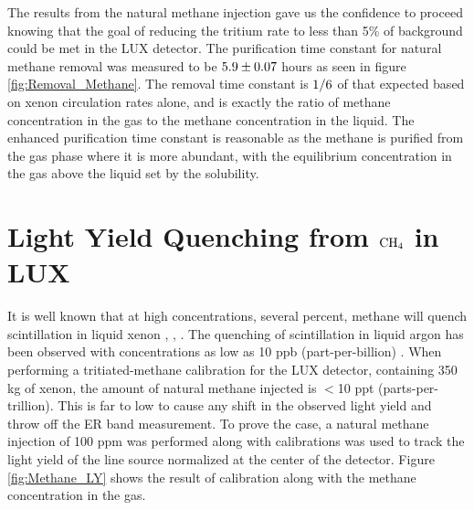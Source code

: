 The results from the natural methane injection gave us the confidence to proceed knowing that the goal of reducing the tritium rate to less than 5\% of background could be met in the LUX detector. The purification time constant for natural methane removal was measured to be $\rm 5.9 \pm 0.07$ hours as seen in figure \ref{fig:Removal_Methane}. The removal time constant is $\rm 1/6$ of that expected based on xenon circulation rates alone, and is exactly the ratio of methane concentration in the gas to the methane concentration in the liquid. The enhanced purification time constant is reasonable as the methane is purified from the gas phase where it is more abundant, with the equilibrium concentration in the gas above the liquid set by the solubility.



\section{Light Yield Quenching from $\rm CH_4$ in LUX}

It is well known that at high concentrations, several percent, methane will quench scintillation in liquid xenon \cite{bondar2006two}, \cite{Kirill_Methane}, \cite{Shibamura} \cite{Xe_CH4_Theory}. The quenching of scintillation in liquid argon has been observed with concentrations as low as 10 ppb (part-per-billion) \cite{Ar_CH4}. When performing a tritiated-methane calibration for the LUX detector, containing 350 kg of xenon, the amount of natural methane injected is $<$10 ppt (parts-per-trillion). This is far to low to cause any shift in the observed light yield and throw off the ER band measurement. To prove the case, a natural methane injection of 100 ppm was performed along with \KrCal calibrations was used to track the light yield of the line source normalized at the center of the detector. Figure \ref{fig:Methane_LY} shows the result of \KrCal calibration along with the methane concentration in the gas.

